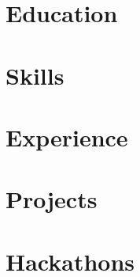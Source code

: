 \documentclass[letter,10pt]{article}
\begin{document}


\section{Education}


\section{Skills}


\section{Experience}


\section{Projects}


% 

\section{Hackathons}








% 
\end{document}
